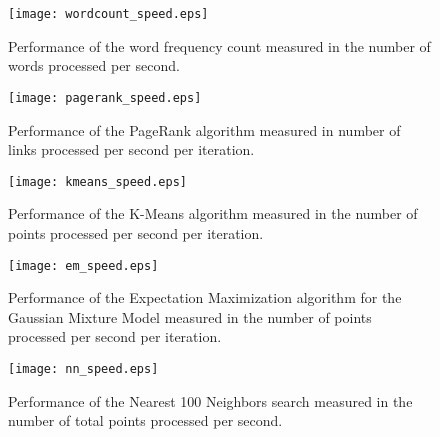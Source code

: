 \begin{figure}
  \begin{center}
  \texttt{[image: wordcount\_speed.eps]}
  \end{center}
  \vspace{-0.2cm}
  \caption{Performance of the word frequency count measured in the number of words processed per second.
  }
  \label{fig:wordcount_speed}
\end{figure}
\begin{figure}
  \begin{center}
  \texttt{[image: pagerank\_speed.eps]}
  \end{center}
  \vspace{-0.2cm}
  \caption{Performance of the PageRank algorithm measured in number of links processed per second per iteration.
  }
  \label{fig:pagerank_speed}
\end{figure}
\begin{figure}
  \begin{center}
  \texttt{[image: kmeans\_speed.eps]}
  \end{center}
  \vspace{-0.2cm}
  \caption{Performance of the K-Means algorithm measured in the number of points processed per second per iteration.
  }
  \label{fig:kmeans_speed}
\end{figure}
\begin{figure}
  \begin{center}
  \texttt{[image: em\_speed.eps]}
  \end{center}
  \vspace{-0.2cm}
  \caption{Performance of the Expectation Maximization algorithm for the Gaussian Mixture Model measured in the number of points processed per second per iteration.
  }
  \label{fig:em}
\end{figure}
\begin{figure}
  \begin{center}
  \texttt{[image: nn\_speed.eps]}
  \end{center}
  \vspace{-0.2cm}
  \caption{Performance of the Nearest 100 Neighbors search measured in the number of total points processed per second.
  }
  \label{fig:nn}
\end{figure}
